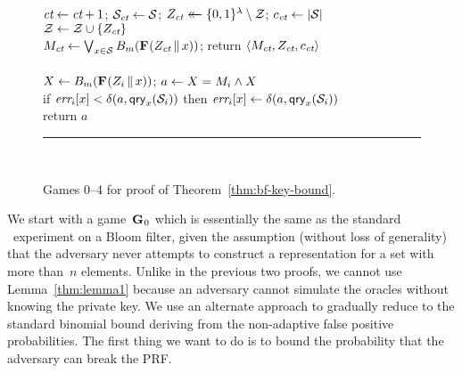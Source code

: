 \begin{figure*}
{    $\textit{ct} \gets \textit{ct}+1$;
    $\mathcal{S}_{\textit{ct}} \gets \mathcal{S}$;
    $Z_{\textit{ct}} \mathrel{\leftarrow\mkern-14mu\leftarrow} \{0,1\}^\lambda \setminus \mathcal{Z}$;
    $c_{\textit{ct}} \gets |\mathcal{S}|$\\
    $\mathcal{Z} \gets \mathcal{Z} \cup \{Z_{\textit{ct}}\}$\\
    $M_{\textit{ct}} \gets \bigvee_{x \in \mathcal{S}} {B}_m(\textup{\textbf{F}}\hspace{0.5pt}(Z_{\textit{ct}} \, \| \, x))$;
    return $\langle M_{\textit{ct}}, Z_{\textit{ct}}, c_{\textit{ct}} \rangle$
  \\[6pt]
  \\[2pt]
    $X \gets {B}_m(\textup{\textbf{F}}\hspace{0.5pt}(Z_i \, \| \, x))$;
    $a \gets X = M_i \wedge X$\\
    if $\textit{err}_i[x] < \delta(a,\mathsf{qry}_x(\mathcal{S}_i))$ then
          $\textit{err}_i[x] \gets \delta(a,\mathsf{qry}_x(\mathcal{S}_i))$\\
    return $a$
  \\[4pt]
  \hrule
  \vspace{2pt}
  \hfill{}\\[2pt]
}
\caption{Games 0--4 for proof of Theorem~\ref{thm:bf-key-bound}.}
\label{fig:kbf-errep/games}
\end{figure*}

We start with a game~$\textup{\textbf{G}}\hspace{0.5pt}_0$ which is essentially the same as the standard
\errep\ experiment on a Bloom filter, given the assumption (without loss of
generality) that the adversary never attempts to construct a representation for
a set with more than~$n$ elements.
%
%
Unlike in the previous two proofs, we cannot use Lemma~\ref{thm:lemma1} because
an adversary cannot simulate the oracles without knowing the private key. We use
an alternate approach to gradually reduce to the standard binomial bound
deriving from the non-adaptive false positive probabilities. The first thing we
want to do is to bound the probability that the adversary can break the PRF.

